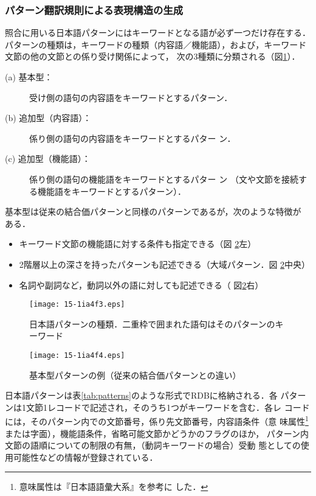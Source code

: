 \documentclass[japanese]{jnlp_1.4}
\begin{document}
\subsubsection{パターン翻訳規則による表現構造の生成}

照合に用いる日本語パターンにはキーワードとなる語が必ず一つだけ存在する．
パターンの種類は，キーワードの種類（内容語／機能語），および，キーワード
文節の他の文節との係り受け関係によって，
次の3種類に分類される（図\ref{fig:JapanesePatterns}）．


\begin{description}
\item[(a) 基本型：]
  受け側の語句の内容語をキーワードとするパターン．
  
\item[(b) 追加型（内容語）：] 係り側の語句の内容語をキーワードとするパター
  ン．
\item[(c) 追加型（機能語）：] 係り側の語句の機能語をキーワードとするパター
  ン
（文や文節を接続する機能語をキーワードとするパターン）．
\end{description}

基本型は従来の結合価パターンと同様のパターンであるが，次のような特徴が
ある．
\begin{itemize}
\item キーワード文節の機能語に対する条件も指定できる（図
  \ref{fig:baseType}左）
\item 2階層以上の深さを持ったパターンも記述できる（大域パターン．図
  \ref{fig:baseType}中央）
\item 名詞や副詞など，動詞以外の語に対しても記述できる（
  図\ref{fig:baseType}右）
\end{itemize}

\begin{figure}[b]
  \centering
      \texttt{[image: 15-1ia4f3.eps]}
  \caption{日本語パターンの種類．二重枠で囲まれた語句はそのパターンのキーワード}
  \label{fig:JapanesePatterns}
\end{figure}
\begin{figure}[b]
  \centering
      \texttt{[image: 15-1ia4f4.eps]}
  \caption{基本型パターンの例（従来の結合価パターンとの違い）}
  \label{fig:baseType}
\end{figure}


日本語パターンは表\ref{tab:patterns}のような形式でRDBに格納される．各
パターンは1文節1レコードで記述され，そのうち1つがキーワードを含む．各レ
コードには，そのパターン内での文節番号，係り先文節番号，内容語条件（意
味属性\footnote{意味属性は『日本語語彙大系』\cite{Ikehara1999}を参考に
  した．}または字面），機能語条件，省略可能文節かどうかのフラグのほか，
パターン内文節の語順についての制限の有無，（動詞キーワードの場合）受動
態としての使用可能性などの情報が登録されている．
\end{document}
